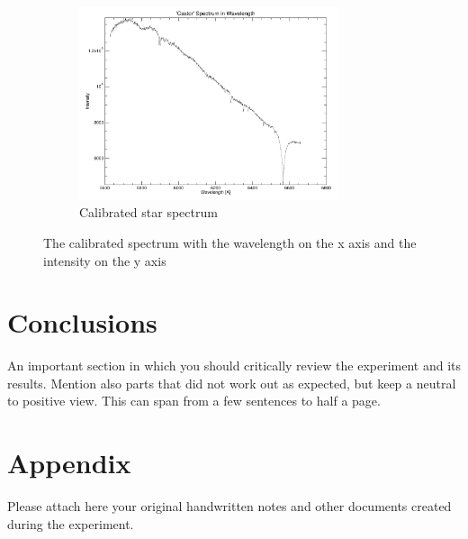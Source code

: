 \documentclass[12pt,a4paper]{article}
\begin{document}
\begin{enumerate}
\begin{figure}[H]
\begin{subfigure}{0.49\textwidth}
                \end{subfigure}
                \begin{subfigure}{0.49\textwidth}
                  \centering
                  \includegraphics[width=3in]{Pictures/Castor_121sec_2025_2-Spectrum.pdf}
                  \caption{Calibrated star spectrum}
                  \label{fig:calibrated_starspec}
                \end{subfigure}
                \caption{The calibrated spectrum with the wavelength on the x axis and the intensity on the y axis}
              \end{figure}
      \end{enumerate}
\section{Conclusions}
An important section in which you should critically review the experiment and its results. Mention also parts that did not work out as expected, but keep a neutral to positive view. This can span from a few sentences to half a page.

\setcounter{secnumdepth}{0}

\printbibliography
\appendix
\section{Appendix}

Please attach here your original handwritten notes and other documents created during the experiment.
\end{document}
